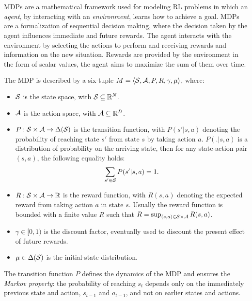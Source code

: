 \section{}\label{sec:mdp}
\ac{MDPs} are a mathematical framework used for modeling \ac{RL} problems in which an \emph{agent}, by interacting with an \emph{environment}, learns how to achieve a goal. \ac{MDPs} are a formalization of sequential decision making, where the decision taken by the agent influences immediate and future rewards. The agent interacts with the environment by selecting the actions to perform and receiving rewards and information on the new situation. Rewards are provided by the environment in the form of scalar values, the agent aims to maximize the sum of them over time.
\begin{definition}[MDP]\label{def:mdp}
The \ac{MDP} is described by a six-tuple $M=\langle \mathcal{S}, \mathcal{A}, P, R, \gamma, \mu \rangle$, where:
\begin{itemize}
	\item $\mathcal{S}$ is the state space, with $\mathcal{S}\subseteq\mathbb{R}^N$.
	\item $\mathcal{A}$ is the action space, with $\mathcal{A}\subseteq\mathbb{R}^D$.
	\item $P: \mathcal{S} \times \mathcal{A} \to \Delta(\mathcal{S})$ is the transition function, with $P(s'|s,a)$ denoting the probability of reaching state $s'$ from state $s$ by taking action $a$. $P(.|s,a)$ is a distribution of probability on the arriving state, then for any state-action pair $(s,a)$, the following equality holds:
	\begin{align} \sum_{s' \in \mathcal{S}} P(s'|s,a) = 1. \end{align}
	\item $R: \mathcal{S} \times \mathcal{A} \to \mathbb{R}$ is the reward function, with $R(s,a)$ denoting the expected reward from taking action $a$ in state $s$. Usually the reward function is bounded with a finite value $R$ such that $R = \sup_{(s,a) \in \mathcal{S} \times \mathcal{A}} R(s,a)$.
	\item $\gamma \in [0, 1)$ is the discount factor, eventually used to discount the present effect of future rewards.
	\item $\mu \in \Delta(\mathcal{S})$ is the initial-state distribution.
\end{itemize}
\end{definition}
\noindent The transition function $P$ defines the dynamics of the \ac{MDP} and ensures the \emph{Markov property}: the probability of reaching $s_t$ depends only on the immediately previous state and action, $s_{t-1}$ and $a_{t-1}$, and not on earlier states and actions.\\
